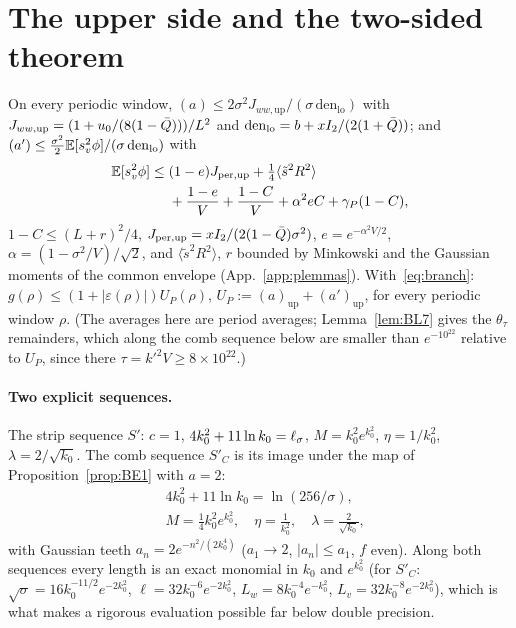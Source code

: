 \section{The upper side and the two-sided theorem}
\label{sec:upper}

\begin{lemma} \proofst
\label{lem:AZ1P}
On every periodic window,
$(a)\le2\sigma^2J_{ww,\mathrm{up}}/(\sigma\,\mathrm{den}_{\mathrm{lo}})$ with $J_{ww,\mathrm{up}}=(1+u_0/(8(1-\bar Q)))/L^2$ and
$\mathrm{den}_{\mathrm{lo}}=b+xI_2/(2(1+\bar Q))$; and $(a')\le\tfrac{\sigma^2}{2}\mathbb{E}[s_v^2\phi]/(\sigma\,\mathrm{den}_{\mathrm{lo}})$ with
\begin{equation}
\begin{aligned}\mathbb{E}[s_v^2\phi]\le{}&(1-e)J_{\mathrm{per,up}}+\tfrac14\langle\tilde s^2R^2\rangle\\&+\frac{1-e}{V}+\frac{1-C}{V}+\alpha^2eC+\gamma_P(1-C),\end{aligned}
\end{equation}
$1-C\le(L+r)^2/4$, $J_{\mathrm{per,up}}=xI_2/(2(1-\bar Q)\sigma^2)$, $e=e^{-\alpha^2V/2}$, $\alpha=(1-\sigma^2/V)/\sqrt2$, and
$\langle\tilde s^2R^2\rangle$, $r$ bounded by Minkowski and the Gaussian moments of the common envelope (App.~\ref{app:plemmas}).
With~\eqref{eq:branch}: $g(\rho)\le(1+|\varepsilon(\rho)|)U_P(\rho)$, $U_P:=(a)_{\mathrm{up}}+(a')_{\mathrm{up}}$, for every periodic window $\rho$.
(The averages here are period averages; Lemma~\ref{lem:BL7} gives the $\theta_\tau$ remainders, which along the comb sequence below are smaller
than $e^{-10^{22}}$ relative to $U_P$, since there $\tau=k'^2V\ge8\times10^{22}$.)
\end{lemma}

\paragraph*{Two explicit sequences.}
The strip sequence $S'$: $c=1$, $4k_0^2+11\ln k_0=\ell_\sigma$, $M=k_0^2e^{k_0^2}$, $\eta=1/k_0^2$, $\lambda=2/\sqrt{k_0}$. The comb sequence $S'_C$ is its image
under the map of Proposition~\ref{prop:BE1} with $a=2$:
\begin{equation}
\begin{aligned}&4k_0^2+11\ln k_0=\ln(256/\sigma),\\ &M=\tfrac14k_0^2e^{k_0^2},\quad \eta=\tfrac1{k_0^2},\quad\lambda=\tfrac2{\sqrt{k_0}},\end{aligned}
\end{equation}
with Gaussian teeth $a_n=2e^{-n^2/(2k_0^4)}$ ($a_1\to2$, $|a_n|\le a_1$, $f$ even). Along both sequences every length is an exact monomial in
$k_0$ and $e^{k_0^2}$ (for $S'_C$: $\sqrt\sigma=16k_0^{-11/2}e^{-2k_0^2}$, $\ell=32k_0^{-6}e^{-2k_0^2}$, $L_w=8k_0^{-4}e^{-k_0^2}$,
$L_v=32k_0^{-8}e^{-2k_0^2}$), which is what makes a rigorous evaluation possible far below double precision.

